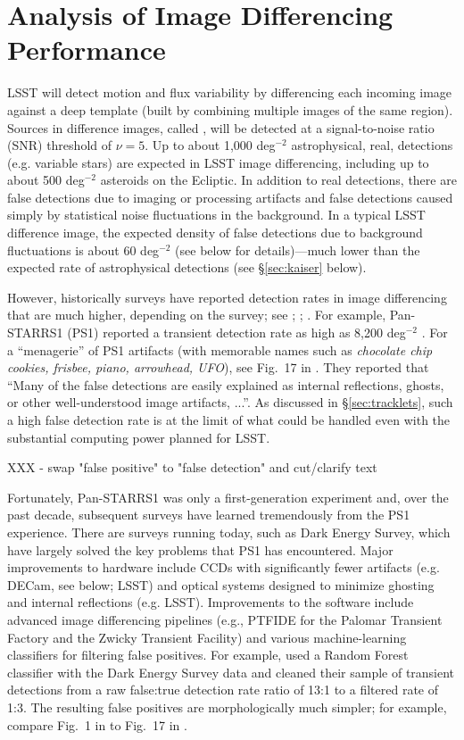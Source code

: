 \section{Analysis of Image Differencing Performance \label{sec:imDiff}}

LSST will detect motion and flux variability by differencing each incoming image
against a deep template (built by combining multiple images of the same region).
Sources in difference images, called \DIASources, will be detected at a signal-to-noise
ratio (SNR) threshold of $\nu=5$. Up to about 1,000 deg$^{-2}$
astrophysical, real, detections (e.g. variable stars) are expected in LSST image differencing, including
up to about 500 deg$^{-2}$ asteroids on the Ecliptic. In addition to real detections,
there are false detections due to imaging or processing artifacts and 
false detections caused simply by statistical noise
fluctuations in the background. In a typical LSST difference image, the expected
density of false detections due to background fluctuations is about 60 deg$^{-2}$
(see below for details)---much lower than the expected rate of astrophysical
detections (see \S\ref{sec:kaiser} below). 

However, historically surveys have reported detection rates in image differencing that are much
higher, depending on the survey; see \cite{denneau13}; \cite{kessler15}; \cite{goldstein15}.
For example, Pan-STARRS1 (PS1) reported a transient detection rate as high as 8,200 deg$^{-2}$
\citep{denneau13}. For a ``menagerie'' of PS1 artifacts (with memorable names such as
{\it chocolate chip cookies, frisbee, piano, arrowhead, UFO}), see Fig.~17 in \cite{denneau13}.
They reported that ``Many of the false detections are easily explained as internal reflections,
ghosts, or other well-understood image artifacts, ...''. As discussed in \S\ref{sec:tracklets},
such a high false detection rate is at the limit of what could be handled even
with the substantial computing power planned for LSST.

XXX - swap "false positive" to "false detection" and cut/clarify text

Fortunately, Pan-STARRS1 was only a first-generation experiment and, over the past decade,
subsequent surveys have learned tremendously from the PS1 experience. There are surveys
running today, such as Dark Energy Survey, which have largely solved the key problems that
PS1 has encountered. Major improvements to hardware include CCDs with significantly fewer
artifacts (e.g. DECam, see below; LSST) and optical systems designed to minimize ghosting
and internal reflections (e.g. LSST). Improvements to the software include advanced image
differencing pipelines (e.g., PTFIDE for the Palomar Transient Factory and the Zwicky Transient
Facility) and various machine-learning classifiers for filtering false positives. For example,
\cite{goldstein15} used a Random Forest classifier with the Dark Energy Survey data
and cleaned their sample of transient detections from a raw false:true detection
rate ratio of 13:1 to a filtered rate of 1:3. The resulting false positives are
morphologically much simpler; for example, compare
Fig.~1 in \cite{goldstein15} to Fig.~17 in \cite{denneau13}.

